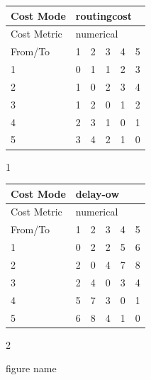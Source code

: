 \begin{figure}
    \centering
    \begin{subtable}{.4\linewidth}
        \centering
        \begin{tabular}{|l|l|l|l|l|l|}
        \hline
        Cost Mode   & \multicolumn{5}{|l|}{routingcost} \\ \hline
        Cost Metric & \multicolumn{5}{|l|}{numerical}   \\ \hline
        From/To     & 1    & 2     & 3   & 4   & 5      \\ \hline
        1           & 0    & 1     & 1   & 2   & 3      \\ \hline
        2           & 1    & 0     & 2   & 3   & 4      \\ \hline
        3           & 1    & 2     & 0   & 1   & 2      \\ \hline
        4           & 2    & 3     & 1   & 0   & 1      \\ \hline
        5           & 3    & 4     & 2   & 1   & 0      \\ \hline
        \end{tabular}
    \caption{1}
    \end{subtable}
    \begin{subtable}{.4\linewidth}
        \centering
        \begin{tabular}{|l|l|l|l|l|l|}
        \hline
        Cost Mode   & \multicolumn{5}{|l|}{delay-ow}    \\ \hline
        Cost Metric & \multicolumn{5}{|l|}{numerical}   \\ \hline
        From/To     & 1    & 2     & 3   & 4   & 5      \\ \hline
        1           & 0    & 2     & 2   & 5   & 6      \\ \hline
        2           & 2    & 0     & 4   & 7   & 8      \\ \hline
        3           & 2    & 4     & 0   & 3   & 4      \\ \hline
        4           & 5    & 7     & 3   & 0   & 1      \\ \hline
        5           & 6    & 8     & 4   & 1   & 0      \\ \hline
        \end{tabular}
    \caption{2}
    \end{subtable}

    \caption{figure name}\label{fig:label}
    \label{table:costmap-example-boundary}
\end{figure}

